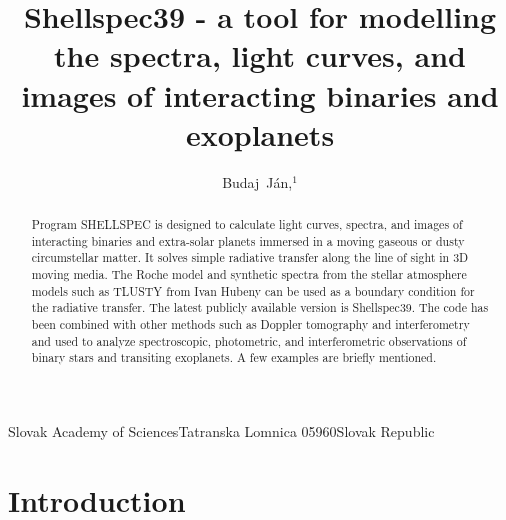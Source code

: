 \documentclass[11pt,twoside]{article}
\begin{document}
\title{Shellspec39 - a tool for modelling the spectra, light curves,
and images of interacting binaries and exoplanets}
\author{Budaj~J\'{a}n,$^1$
}

{Slovak Academy of Sciences}{Tatranska Lomnica}{}
{05960}{Slovak Republic}

\begin{abstract}
Program SHELLSPEC is designed to calculate light curves, spectra, and 
images of interacting binaries and extra-solar planets immersed in 
a moving gaseous or dusty circumstellar matter. It solves simple 
radiative transfer along the line of sight in 3D moving media.
The Roche model and synthetic spectra from the stellar atmosphere models
such as TLUSTY from Ivan Hubeny can be used as a boundary condition for
the radiative transfer.
The latest publicly available version is Shellspec39.
The code has been combined with other methods such as Doppler tomography
and interferometry and used to analyze spectroscopic, photometric, and 
interferometric observations of binary stars and transiting exoplanets. 
A few examples are briefly mentioned.
\end{abstract}


\section{Introduction}
\end{document}
